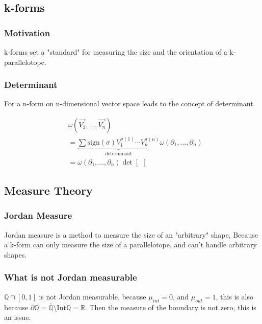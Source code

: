 \documentclass[12pt]{armath}
\newcommand{\R}{\mathbb{R}}
\newcommand{\Q}{\mathbb{Q}}
\begin{document}
\subsection{k-forms}%
\label{sub:k_forms}

\subsubsection{Motivation}%
\label{ssub:motivation}

k-forms set a "standard" for measuring the size and the orientation of a
k-parallelotope.

\subsubsection{Determinant}%
\label{ssub:determinant}

For a n-form on n-dimensional vector space leads to the concept of determinant.

\begin{align*}
  &\omega(\vec{V_1},\ldots,\vec{V_n})\\
  &=\underbrace{\sum\text{sign}(\sigma)V_1^{\sigma(1)}\cdots
  V_n^{\sigma(n)}}_\text{determinant}\omega(\partial_1,\ldots,\partial_n)\\
  &=\omega(\partial_1,\ldots,\partial_n)\det\left[\ \ \right]
\end{align*}

\subsection{Measure Theory}%
\label{sub:measure_theory}

\subsubsection{Jordan Measure}%
\label{ssub:jordan_measure}

Jordan measure is a method to measure the size of an "arbitrary" shape, Because
a k-form can only measure the size of a parallelotope, and can't handle
arbitrary shapes.

\subsubsection{What is not Jordan measurable}%
\label{ssub:what_is_not_jordan_measurable}

$\Q\cap[0,1]$ is not Jordan measurable, because $\mu_{int}=0$, and
$\mu_{out}=1$, this is also because $\partial
\Q=\bar{\Q}\setminus\text{Int}{\Q}=\R$. Then the measure of the boundary is not
zero, this is an issue.
\end{document}
